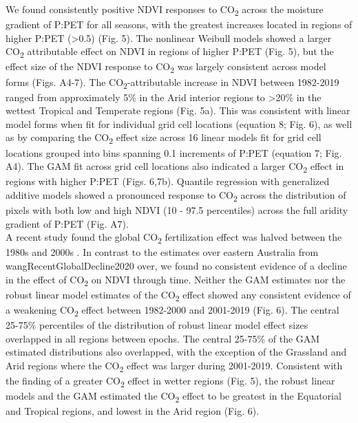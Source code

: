 \documentclass[gc, manuscript]{copernicus}
\begin{document}
We found consistently positive NDVI responses to CO\textsubscript{2}
across the moisture gradient of P:PET for all seasons, with the greatest
increases located in regions of higher P:PET (\textgreater0.5) (Fig. 5).
The nonlinear Weibull models showed a larger CO\textsubscript{2}
attributable effect on NDVI in regions of higher P:PET (Fig. 5), but the
effect size of the NDVI response to CO\textsubscript{2} was largely
consistent across model forms (Figs. A4-7). The
CO\textsubscript{2}-attributable increase in NDVI between 1982-2019
ranged from approximately 5\% in the Arid interior regions to
\textgreater20\% in the wettest Tropical and Temperate regions (Fig.
5a). This was consistent with linear model forms when fit for individual
grid cell locations (equation 8; Fig. 6), as well as by comparing the
CO\textsubscript{2} effect size across 16 linear models fit for grid
cell locations grouped into bins spanning 0.1 increments of P:PET
(equation 7; Fig. A4). The GAM fit across grid cell locations also
indicated a larger CO\textsubscript{2} effect in regions with higher
P:PET (Figs. 6,7b). Quantile regression with generalized additive models
showed a pronounced response to CO\textsubscript{2} across the
distribution of pixels with both low and high NDVI (10 - 97.5
percentiles) across the full aridity gradient of P:PET (Fig. A7).\\
A recent study found the global CO\textsubscript{2} fertilization effect
was halved between the 1980s and 2000s
\citep{wangRecentGlobalDecline2020}. In contrast to the estimates over
eastern Australia from wangRecentGlobalDecline2020 over, we found no
consistent evidence of a decline in the effect of CO\textsubscript{2} on
NDVI through time. Neither the GAM estimates nor the robust linear model
estimates of the CO\textsubscript{2} effect showed any consistent
evidence of a weakening CO\textsubscript{2} effect between 1982-2000 and
2001-2019 (Fig. 6). The central 25-75\% percentiles of the distribution
of robust linear model effect sizes overlapped in all regions between
epochs. The central 25-75\% of the GAM estimated distributions also
overlapped, with the exception of the Grassland and Arid regions where
the CO\textsubscript{2} effect was larger during 2001-2019. Consistent
with the finding of a greater CO\textsubscript{2} effect in wetter
regions (Fig. 5), the robust linear models and the GAM estimated the
CO\textsubscript{2} effect to be greatest in the Equatorial and Tropical
regions, and lowest in the Arid region (Fig. 6).\\
\clearpage
\end{document}
